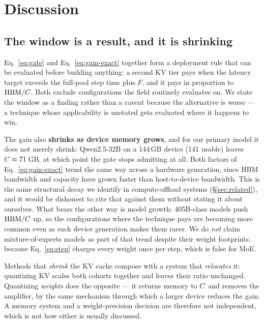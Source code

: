 %
\section{Discussion}
\label{sec:discussion}

\subsection{The window is a result, and it is shrinking}

Eq.~\ref{eq:gate} and Eq.~\ref{eq:gain-exact} together form a deployment rule
that can be evaluated before building anything: a second KV tier pays when the
latency target exceeds the full-pool step time plus $F$, and it pays in
proportion to $\mathrm{HBM}/C$. Both exclude configurations the field routinely
evaluates on. We state the window as a finding rather than a caveat because the
alternative is worse --- a technique whose applicability is unstated gets
evaluated where it happens to win.

The gain also \textbf{shrinks as device memory grows}, and for our primary model
it does not merely shrink: Qwen2.5-32B on a 144\,GB device (141 usable) leaves
$C \approx 71$\,GB, at which point the gate stops admitting at all. Both
factors of Eq.~\ref{eq:gain-exact} trend the same way across a hardware
generation, since HBM bandwidth and capacity have grown faster than
host-to-device bandwidth. This is the same structural decay we identify in
compute-offload systems (\S\ref{sec:related}), and it would be dishonest to cite
that against them without stating it about ourselves. What bears the other way is
model growth: 405B-class models push $\mathrm{HBM}/C$ up, so the configurations where
the technique pays are becoming more common even as each device generation makes
them rarer. We do \emph{not} claim mixture-of-experts models as part of that
trend despite their weight footprints, because Eq.~\ref{eq:step} charges every
weight once per step, which is false for MoE.

Methods that \emph{shrink} the KV cache compose with a system that
\emph{relocates} it: quantizing KV scales both cohorts together and leaves their
ratio unchanged. Quantizing \emph{weights} does the opposite --- it returns
memory to $C$ and removes the amplifier, by the same mechanism through which a
larger device reduces the gain. A memory system and a weight-precision decision
are therefore not independent, which is not how either is usually discussed.

